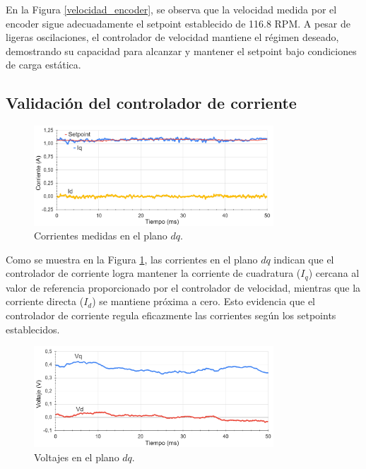 \documentclass[11pt]{report}
\begin{document}
En la Figura \ref{velocidad_encoder}, se observa que la velocidad medida por el encoder sigue adecuadamente el setpoint establecido de 116.8 RPM. A pesar de ligeras oscilaciones, el controlador de velocidad mantiene el régimen deseado, demostrando su capacidad para alcanzar y mantener el setpoint bajo condiciones de carga estática.

\subsection{Validación del controlador de corriente}

\begin{figure}[ht]
	\centering
	\includegraphics[width=0.8\textwidth]{imagenes/CV_CC.png}
	\caption{Corrientes medidas en el plano $dq$.}
	\label{cont_corrientes_dq}
\end{figure}
\FloatBarrier

Como se muestra en la Figura \ref{cont_corrientes_dq}, las corrientes en el plano $dq$ indican que el controlador de corriente logra mantener la corriente de cuadratura ($I_q$) cercana al valor de referencia proporcionado por el controlador de velocidad, mientras que la corriente directa ($I_d$) se mantiene próxima a cero. Esto evidencia que el controlador de corriente regula eficazmente las corrientes según los setpoints establecidos.

\begin{figure}[ht]
	\centering
	\includegraphics[width=0.8\textwidth]{imagenes/CC_DQ.png}
	\caption{Voltajes en el plano $dq$.}
	\label{voltajes_dq}
\end{figure}
\FloatBarrier
\end{document}
